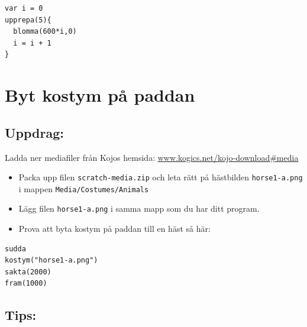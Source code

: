 \begin{lstlisting}[basicstyle={\ttfamily\fontsize{18}{22}\selectfont},numbers=none]
var i = 0          
upprepa(5){
  blomma(600*i,0)
  i = i + 1        
}
\end{lstlisting}
        
\chapter{Byt kostym på paddan}\section*{\color{BrickRed}Uppdrag:}
Ladda ner mediafiler från Kojos hemsida:
\href{http://www.kogics.net/kojo-download#media}{www.kogics.net/kojo-download\#media}


\begin{itemize}

\item {Packa upp filen \lstinline{scratch-media.zip} och leta rätt på hästbilden \lstinline{horse1-a.png} i mappen \lstinline{Media/Costumes/Animals}}
\item {Lägg filen \lstinline{horse1-a.png} i samma mapp som du har ditt program.}
\item {Prova att byta kostym på paddan till en häst så här:}

\end{itemize}



  

\begin{lstlisting}[basicstyle={\ttfamily\fontsize{20}{24}\selectfont},numbers=none]
sudda
kostym("horse1-a.png")  
sakta(2000)
fram(1000)
\end{lstlisting}
        
\section*{\color{OliveGreen}Tips:}


